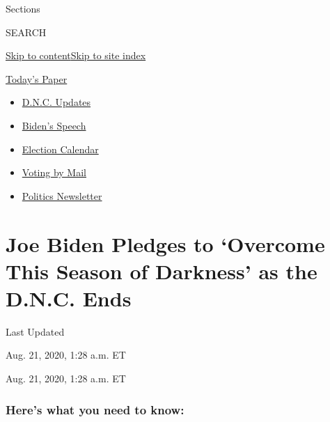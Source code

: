 Sections

SEARCH

\protect\hyperlink{site-content}{Skip to
content}\protect\hyperlink{site-index}{Skip to site index}

\href{https://myaccount.nytimes3xbfgragh.onion/auth/login?response_type=cookie\&client_id=vi}{}

\href{https://www.nytimes3xbfgragh.onion/section/todayspaper}{Today's
Paper}

\begin{itemize}
\item
  \href{https://www.nytimes3xbfgragh.onion/live/2020/08/21/us/dnc-convention-election?action=click\&pgtype=Article\&state=default\&region=TOP_BANNER\&context=storylines_menu}{D.N.C.
  Updates}
\item
  \href{https://www.nytimes3xbfgragh.onion/2020/08/20/us/politics/biden-presidential-nomination-dnc.html?action=click\&pgtype=Article\&state=default\&region=TOP_BANNER\&context=storylines_menu}{Biden's
  Speech}
\item
  \href{https://www.nytimes3xbfgragh.onion/interactive/2019/us/elections/2020-presidential-election-calendar.html?action=click\&pgtype=Article\&state=default\&region=TOP_BANNER\&context=storylines_menu}{Election
  Calendar}
\item
  \href{https://www.nytimes3xbfgragh.onion/interactive/2020/08/11/us/politics/vote-by-mail-us-states.html?action=click\&pgtype=Article\&state=default\&region=TOP_BANNER\&context=storylines_menu}{Voting
  by Mail}
\item
  \href{https://www.nytimes3xbfgragh.onion/newsletters/politics?action=click\&pgtype=Article\&state=default\&region=TOP_BANNER\&context=storylines_menu}{Politics
  Newsletter}
\end{itemize}

\hypertarget{joe-biden-pledges-to-overcome-this-season-of-darkness-as-the-dnc-ends}{%
\section{Joe Biden Pledges to `Overcome This Season of Darkness' as the
D.N.C.
Ends}\label{joe-biden-pledges-to-overcome-this-season-of-darkness-as-the-dnc-ends}}

Last Updated

Aug. 21, 2020, 1:28 a.m. ET

Aug. 21, 2020, 1:28 a.m. ET

\hypertarget{heres-what-you-need-to-know}{%
\subsubsection{Here's what you need to
know:}\label{heres-what-you-need-to-know}}

